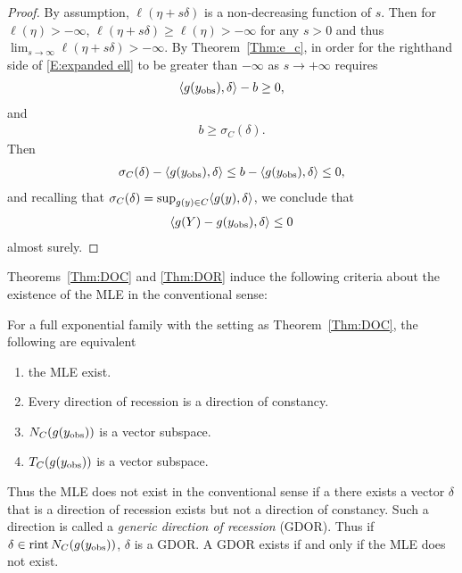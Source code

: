 \begin{proof}
By assumption, $\ell(\eta + s\delta)$ is a non-decreasing function of $s$.  
Then for $\ell(\eta ) > -\infty$, $\ell(\eta + s\delta) \geq \ell(\eta )  > -\infty$
for any $s>0$ and thus $\lim_{s \to \infty} \ell(\eta+s\delta) > -\infty$.
By Theorem~\ref{Thm:e_c}, in order for the righthand side of \eqref{E:expanded ell} 
to be greater than $-\infty$ as $s \to +\infty$ requires
\begin{align*}
	\langle g(y_{\textrm{obs}}), \delta \rangle - b \geq 0,
\end{align*}
and
\begin{align*}
	b \geq \sigma_C(\delta). %
\end{align*}
Then
\begin{align*}
	\sigma_C(\delta)  - \langle g(y_{\textrm{obs}}), \delta \rangle \leq b - \langle g(y_{\textrm{obs}}), \delta \rangle  \leq 0,
\end{align*}
and recalling that $\sigma_C(\delta) = \sup_{g(y) \in C} \langle g(y), \delta \rangle$, 
we conclude that
\begin{align*}
	\langle g(Y) - g(y_{\textrm{obs}}),\delta  \rangle \leq 0
\end{align*}
almost surely.
\end{proof}

Theorems~\ref{Thm:DOC} and \ref{Thm:DOR} induce the following criteria about the
existence of the MLE in the conventional sense:

\begin{theorem} \label{Thm:MLE existence}
For a full exponential family with the setting as Theorem~\ref{Thm:DOC}, the 
following are equivalent 
\begin{enumerate}
\item the MLE exist.
\item Every direction of recession is a direction of constancy.
\item $N_C(g(y_{\textrm{obs}}))$ is a vector subspace.
\item $T_C(g(y_{\textrm{obs}}))$ is a vector subspace.
\end{enumerate}
\end{theorem}

Thus the MLE does not exist in the conventional sense if a there exists a vector 
$\delta$ that is a direction of recession exists but not a direction of constancy.  
Such a direction is called a \emph{generic direction of recession} (GDOR).
Thus if $\delta \in \operatorname{rint} N_C(g(y_{\textrm{obs}}))$, $\delta$ is a GDOR.  A GDOR exists if and 
only if the MLE does not exist.


